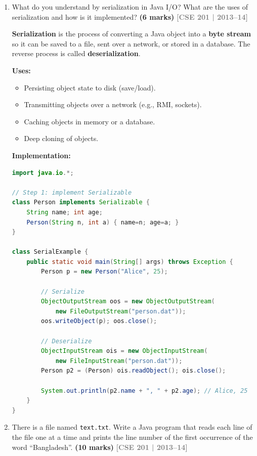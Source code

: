 \documentclass[12pt,a3paper]{article}
\newcommand{\yr}[1]{\hfill\textcolor{gray}{\small\textbf{[#1]}}}
\newcommand{\mk}[1]{\textcolor{orange!70!black}{\small\textbf{(#1 marks)}}}
\begin{document}
\begin{enumerate}
\item What do you understand by serialization in Java I/O? What are the uses of serialization and how is it implemented? \mk{6}
\yr{CSE 201 | 2013--14}

\begin{tcolorbox}[enhanced,breakable,ansbox,
  colback=cA!4,colframe=cA,boxrule=0.8pt,arc=5pt,
  title={\textbf{Answer --- Serialization in Java}},
  fonttitle=\bfseries\color{white},colbacktitle=cA]

\textbf{Serialization} is the process of converting a Java object into
a \textbf{byte stream} so it can be saved to a file, sent over a
network, or stored in a database. The reverse process is called
\textbf{deserialization}.

\textbf{Uses:}
\begin{itemize}[itemsep=2pt]
  \item Persisting object state to disk (save/load).
  \item Transmitting objects over a network (e.g., RMI, sockets).
  \item Caching objects in memory or a database.
  \item Deep cloning of objects.
\end{itemize}

\textbf{Implementation:}
\begin{lstlisting}[language=Java]
import java.io.*;

// Step 1: implement Serializable
class Person implements Serializable {
    String name; int age;
    Person(String n, int a) { name=n; age=a; }
}

class SerialExample {
    public static void main(String[] args) throws Exception {
        Person p = new Person("Alice", 25);

        // Serialize
        ObjectOutputStream oos = new ObjectOutputStream(
            new FileOutputStream("person.dat"));
        oos.writeObject(p); oos.close();

        // Deserialize
        ObjectInputStream ois = new ObjectInputStream(
            new FileInputStream("person.dat"));
        Person p2 = (Person) ois.readObject(); ois.close();

        System.out.println(p2.name + ", " + p2.age); // Alice, 25
    }
}
\end{lstlisting}
\end{tcolorbox}

\item There is a file named \texttt{text.txt}. Write a Java program that reads each line of the file one at a time and prints the line number of the first occurrence of the word ``Bangladesh''. \mk{10}
\yr{CSE 201 | 2013--14}


\end{enumerate}
\end{document}
